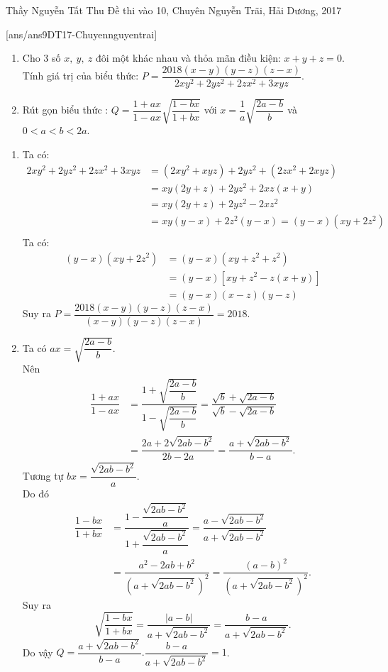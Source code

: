 \begin{name}
{Thầy  Nguyễn Tất Thu}
{Đề thi vào 10, Chuyên Nguyễn Trãi, Hải Dương, 2017}
\end{name}
\setcounter{ex}{0}
[ans/ans9DT17-Chuyennguyentrai]
\begin{ex}%
    \hfill
    \begin{enumerate}
        \item Cho 3 số $x,\ y,\ z$ đôi một khác nhau và thỏa mãn điều kiện: $x+y+z=0$. Tính giá trị của biểu thức: $P=\dfrac{2018(x-y)(y-z)(z-x)}{2xy^{2}+2yz^{2}+2zx^{2}+3xyz}$.
        \item Rút gọn biểu thức : $Q=\dfrac{1+ax}{1-ax}\sqrt{\dfrac{1-bx}{1+bx}}$ với $x=\dfrac{1}{a}\sqrt{\dfrac{2a-b}{b}}$ và $0<a<b<2a$.
    \end{enumerate}
\loigiai
    {
    \begin{enumerate}
        \item Ta có: $$ \begin{aligned} 2xy^2+2yz^2+2zx^2+3xyz &=\left( 2xy^2+xyz \right)+2yz^2+\left( 2zx^2+2xyz \right)\\  &=xy\left( 2y+z \right)+2yz^2+2xz\left( x+y \right)\\&=xy\left( 2y+z \right)+2yz^2-2xz^2 \\ 
 & =xy(y-x)+2z^2(y-x)=(y-x)(xy+2 z^2) \\ 
\end{aligned}$$
Ta có: $$\begin{aligned} (y-x)(xy+2z^2)&=(y-x)(xy+z^2+z^2)\\&=(y-x)[ xy+z^2-z\left( x+y \right)]\\& =(y-x)\left( x-z \right)\left( y-z \right) \end{aligned}$$
Suy ra $ P=\dfrac{2018(x-y)(y-z)(z-x)}{(x-y)(y-z)(z-x)}=2018$.
        \item Ta có $ax=\sqrt{\dfrac{2a-b}{b}}$.\\
Nên $$\begin{aligned} \dfrac{1+ax}{1-ax}&=\dfrac{1+\sqrt{\dfrac{2a-b}{b}}}{1-\sqrt{\dfrac{2a-b}{b}}}=\dfrac{\sqrt{b}+\sqrt{2a-b}}{\sqrt{b}-\sqrt{2a-b}}\\&=\dfrac{2a+2\sqrt{2ab-b^2}}{2b-2a}=\dfrac{a+\sqrt{2ab-b^2}}{b-a}. \end{aligned}$$
Tương tự $bx=\dfrac{\sqrt{2ab-b^2}}{a}$.\\
Do đó $$\begin{aligned} \dfrac{1-bx}{1+bx}&=\dfrac{1-\dfrac{\sqrt{2ab-b^2}}{a}}{1+\dfrac{\sqrt{2ab-{{b}^{2}}}}{a}}=\dfrac{a-\sqrt{2ab-{{b}^{2}}}}{a+\sqrt{2ab-{{b}^{2}}}}\\&=\dfrac{{{a}^{2}}-2ab+{{b}^{2}}}{{{\left( a+\sqrt{2ab-{{b}^{2}}} \right)}^{2}}}=\dfrac{{{\left( a-b \right)}^{2}}}{{{\left( a+\sqrt{2ab-{{b}^{2}}} \right)}^{2}}}.\end{aligned}$$
Suy ra $$\sqrt{\dfrac{1-bx}{1+bx}}=\dfrac{\left| a-b \right|}{a+\sqrt{2ab-{{b}^{2}}}}=\dfrac{b-a}{a+\sqrt{2ab-{{b}^{2}}}}.$$
Do vậy $Q=\dfrac{a+\sqrt{2ab-{{b}^{2}}}}{b-a}.\dfrac{b-a}{a+\sqrt{2ab-{{b}^{2}}}}=1$.
        
    \end{enumerate}
    }
\end{ex}


